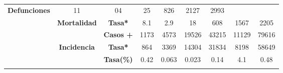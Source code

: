 \begin{tabular}{ccc|cccccc|}
		\multirow{-2}{*}{\cellcolor[HTML]{FFFFC7}\textbf{Defunciones}} &
		\multicolumn{1}{c|}{\multirow{-2}{*}{\cellcolor[HTML]{FFFFC7}11}} &
		\multicolumn{1}{c|}{\multirow{-2}{*}{\cellcolor[HTML]{FFFFC7}04}} &
		\multicolumn{1}{c|}{\multirow{-2}{*}{\cellcolor[HTML]{FFFFC7}25}} &
		\multicolumn{1}{c|}{\multirow{-2}{*}{\cellcolor[HTML]{FFFFC7}826}} &
		\multicolumn{1}{c|}{\multirow{-2}{*}{\cellcolor[HTML]{FFFFC7}2127}} &
		\multirow{-2}{*}{\cellcolor[HTML]{FFFFC7}2993} \\ \cline{3-9} 
		\rowcolor[HTML]{FFFFC7} 
		\multicolumn{1}{|c|}{\cellcolor[HTML]{FFFFC7}} &
		\multicolumn{1}{c|}{\multirow{-2}{*}{\cellcolor[HTML]{FFFFC7}\textbf{Mortalidad}}} &
		\textbf{Tasa*} &
		\multicolumn{1}{c|}{\cellcolor[HTML]{FFFFC7}8.1} &
		\multicolumn{1}{c|}{\cellcolor[HTML]{FFFFC7}2.9} &
		\multicolumn{1}{c|}{\cellcolor[HTML]{FFFFC7}18} &
		\multicolumn{1}{c|}{\cellcolor[HTML]{FFFFC7}608} &
		\multicolumn{1}{c|}{\cellcolor[HTML]{FFFFC7}1567} &
		2205 \\ \cline{2-9} 
		\rowcolor[HTML]{FFFFC7} 
		\multicolumn{1}{|c|}{\cellcolor[HTML]{FFFFC7}} &
		\multicolumn{1}{c|}{\cellcolor[HTML]{FFFFC7}} &
		\textbf{Casos +} &
		\multicolumn{1}{c|}{\cellcolor[HTML]{FFFFC7}1173} &
		\multicolumn{1}{c|}{\cellcolor[HTML]{FFFFC7}4573} &
		\multicolumn{1}{c|}{\cellcolor[HTML]{FFFFC7}19526} &
		\multicolumn{1}{c|}{\cellcolor[HTML]{FFFFC7}43215} &
		\multicolumn{1}{c|}{\cellcolor[HTML]{FFFFC7}11129} &
		79616 \\ \cline{3-9} 
		\rowcolor[HTML]{FFFFC7} 
		\multicolumn{1}{|c|}{\multirow{-6}{*}{\cellcolor[HTML]{FFFFC7}\textbf{2021}}} &
		\multicolumn{1}{c|}{\multirow{-2}{*}{\cellcolor[HTML]{FFFFC7}\textbf{Incidencia}}} &
		\textbf{Tasa*} &
		\multicolumn{1}{c|}{\cellcolor[HTML]{FFFFC7}864} &
		\multicolumn{1}{c|}{\cellcolor[HTML]{FFFFC7}3369} &
		\multicolumn{1}{c|}{\cellcolor[HTML]{FFFFC7}14304} &
		\multicolumn{1}{c|}{\cellcolor[HTML]{FFFFC7}31834} &
		\multicolumn{1}{c|}{\cellcolor[HTML]{FFFFC7}8198} &
		58649 \\ \hline
		\rowcolor[HTML]{E2EFDA} 
		\multicolumn{1}{|c|}{\cellcolor[HTML]{E2EFDA}} &
		\multicolumn{1}{c|}{\cellcolor[HTML]{E2EFDA}} &
		\textbf{Tasa(\%)} 
		&\multicolumn{1}{c|}{\cellcolor[HTML]{E2EFDA}0.42} 
		&\multicolumn{1}{c|}{\cellcolor[HTML]{E2EFDA}0.063} 
		&\multicolumn{1}{c|}{\cellcolor[HTML]{E2EFDA}0.023} 
		&\multicolumn{1}{c|}{\cellcolor[HTML]{E2EFDA}0.14} 
		&\multicolumn{1}{c|}{\cellcolor[HTML]{E2EFDA}4.1} 
		&0.48 \\ \cline{3-9} 
		\rowcolor[HTML]{E2EFDA} 
		\multicolumn{1}{|c|}{\cellcolor[HTML]{E2EFDA}} 

\end{tabular}
